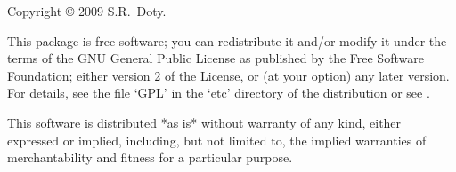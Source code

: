 


Copyright {\copyright} 2009 S.R.~Doty.


\medskip%

This package is free software; you can redistribute it and/or modify
it under the terms of the GNU General Public License as published by
the Free Software Foundation; either version 2 of the License, or
(at your option) any later version. For details, see 
the file `GPL' in the `etc' directory of the {\GAP} distribution or see
. 

This software is distributed *as is* without warranty of any kind,
either expressed or implied, including, but not limited to, the
implied warranties of merchantability and fitness for a particular
purpose.

